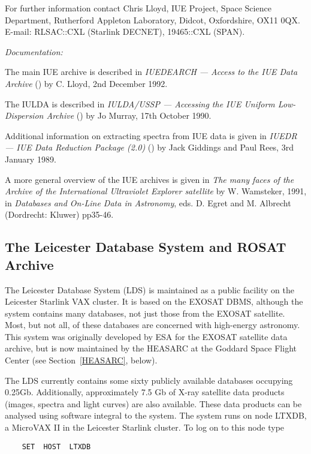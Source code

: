 For further information contact Chris Lloyd, IUE Project, Space Science 
Department, Rutherford Appleton Laboratory, Didcot, Oxfordshire, OX11 
0QX. E-mail: RLSAC::CXL (Starlink DECNET), 19465::CXL (SPAN).

{\it Documentation:}

The main IUE archive is described in {\it IUEDEARCH --- Access to the
IUE Data Archive}
() by C. Lloyd, 2nd December 1992.

The IULDA is described in {\it IULDA/USSP --- Accessing the IUE Uniform
Low-Dispersion Archive} () by Jo Murray,
17th October 1990.

Additional information on extracting spectra from IUE data is given in
{\it IUEDR --- IUE Data Reduction Package (2.0)}
() by Jack 
Giddings and Paul Rees, 3rd January 1989.

A more general overview of the IUE archives is given in {\it The many
faces of the Archive of the International Ultraviolet Explorer 
satellite} by W. Wamsteker, 1991, in {\it Databases and On-Line Data 
in Astronomy}, eds. D. Egret and M. Albrecht (Dordrecht: Kluwer) 
pp35-46.

\subsection{The Leicester Database System and ROSAT Archive
\label{LEICS}}

The Leicester Database System (LDS) is maintained as a public facility 
on the Leicester Starlink VAX cluster. It is based on the EXOSAT DBMS, 
although the system contains many databases, not just those from the 
EXOSAT satellite. Most, but not all, of these databases are concerned 
with high-energy astronomy. This system was originally developed by ESA
for the EXOSAT satellite data archive, but is now maintained by the 
HEASARC at the Goddard Space Flight Center (see Section~\ref{HEASARC}, 
below).

The LDS currently contains some sixty publicly available databases 
occupying 0.25Gb. Additionally, approximately 7.5 Gb of X-ray satellite 
data products (images, spectra and light curves) are also available. 
These data products can be analysed using software integral to the 
system. The system runs on node LTXDB, a MicroVAX II in the Leicester 
Starlink cluster. To log on to this node type

\begin{verbatim}
    SET  HOST  LTXDB
\end{verbatim}

